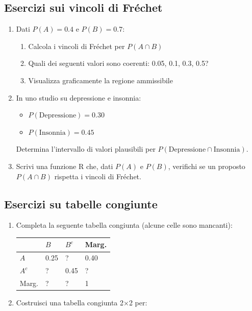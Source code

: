 \documentclass[
  letterpaper,
  DIV=11,
  numbers=noendperiod,
  oneside]{scrreprt}
\providecommand{\tightlist}{%
  \setlength{\itemsep}{0pt}\setlength{\parskip}{0pt}}
\theoremstyle{definition}
\theoremstyle{plain}
\theoremstyle{definition}
\theoremstyle{remark}
\begin{document}
\begin{tcolorbox}
\subsection{Esercizi sui vincoli di
Fréchet}\label{esercizi-sui-vincoli-di-fruxe9chet}

\begin{enumerate}
\def\labelenumi{\arabic{enumi}.}
\setcounter{enumi}{3}
\item
  Dati \(P(A) = 0.4\) e \(P(B) = 0.7\):

  \begin{enumerate}
  \def\labelenumii{\alph{enumii}.}
  \tightlist
  \item
    Calcola i vincoli di Fréchet per \(P(A \cap B)\)
  \item
    Quali dei seguenti valori sono coerenti: 0.05, 0.1, 0.3, 0.5?
  \item
    Visualizza graficamente la regione ammissibile
  \end{enumerate}
\item
  In uno studio su depressione e insonnia:

  \begin{itemize}
  \tightlist
  \item
    \(P(\text{Depressione}) = 0.30\)
  \item
    \(P(\text{Insonnia}) = 0.45\)
  \end{itemize}

  Determina l'intervallo di valori plausibili per
  \(P(\text{Depressione} \cap \text{Insonnia})\).
\item
  Scrivi una funzione R che, dati \(P(A)\) e \(P(B)\), verifichi se un
  proposto \(P(A \cap B)\) rispetta i vincoli di Fréchet.
\end{enumerate}

\subsection{Esercizi su tabelle
congiunte}\label{esercizi-su-tabelle-congiunte}

\begin{enumerate}
\def\labelenumi{\arabic{enumi}.}
\setcounter{enumi}{6}
\item
  Completa la seguente tabella congiunta (alcune celle sono mancanti):

  \begin{longtable}[]{@{}llll@{}}
  \toprule\noalign{}
  & \(B\) & \(B^c\) & Marg. \\
  \midrule\noalign{}
  \endhead
  \bottomrule\noalign{}
  \endlastfoot
  \(A\) & 0.25 & ? & 0.40 \\
  \(A^c\) & ? & 0.45 & ? \\
  Marg. & ? & ? & 1 \\
  \end{longtable}
\item
  Costruisci una tabella congiunta 2×2 per:


\end{enumerate}
\end{tcolorbox}
\end{document}
